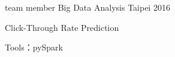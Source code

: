 
\begin{cventries}

  \cventry
    {team member} %
    {Big Data Analysis} %
    {Taipei} %
    {2016} %
    {
      \begin{cvitems} %
        \item {Click-Through Rate Prediction}
        \item {Tools：pySpark}
      \end{cvitems}
    }

\end{cventries}
